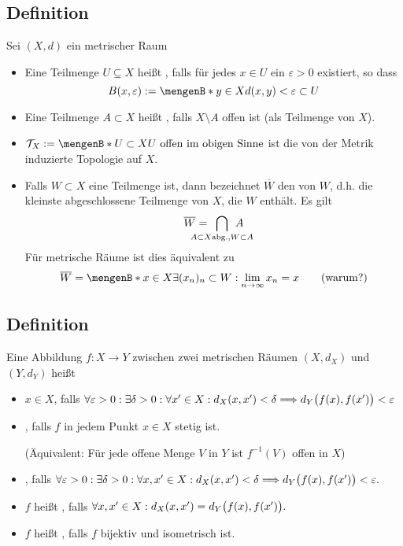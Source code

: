 \subsection[Definition: Offen, abgeschlossen und Abschluss]{Definition} %
\label{sub:12}
Sei $(X,d)$ ein metrischer Raum
\begin{itemize}
	\item Eine Teilmenge $U \subseteq X$ heißt , falls für jedes $x \in U$ ein $\varepsilon > 0$ existiert, so dass 
	\[
		B(x,\varepsilon) := \set[y \in X]{d(x,y) < \varepsilon} \subset U 
	\]
	\item Eine Teilmenge $A \subset X$ heißt , falls $X \setminus A$ offen ist (als Teilmenge von $X$). 
	\item $\mathcal{T}_X := \set[U \subset X]{U \text{ offen im obigen Sinne}} $ ist die von der Metrik induzierte Topologie auf $X$.
	\item Falls $W \subset X$ eine Teilmenge ist, dann bezeichnet $\overline{W}$ den  von $W$, d.h. die kleinste abgeschlossene Teilmenge von $X$, die 
	$W$ enthält. Es gilt
	\[
		\overline{W} = \enspace\bigcap_{\mathclap{A \subset X \text{abg.}, W \subset A}} \enspace A 
	\]
	Für metrische Räume ist dies äquivalent zu
	\[
		\overline{W} = \set[x \in X]{\exists (x_n)_n \subset W : \lim_{n \to \infty} x_n = x} \tag*{(warum?)}
	\]
\end{itemize}

\subsection[Definition: Stetigkeit, gleichmäßige Stetigkeit, Isometrie]{Definition} %
\label{sub:13}
Eine Abbildung $f \colon X \to Y$ zwischen zwei metrischen Räumen $(X,d_X)$ und $(Y,d_Y)$ heißt 
\begin{itemize}
	\item {} $x \in X$, falls
	\(
		\forall \varepsilon >0 : \exists \delta >0 : \forall x' \in X : d_X(x,x') < \delta  \Longrightarrow d_Y \enbrace[\big]{f(x), f(x')} < \varepsilon 
	\)
	\item {}, falls $f$ in jedem Punkt $x \in X$ stetig ist.
	
	(Äquivalent: Für jede offene Menge $V$ in $Y$ ist $f ^{-1}(V)$ offen in $X$) 
	\item {}, falls
	\(
		\forall \varepsilon>0 : \exists \delta >0 : \forall x,x' \in X : d_X(x,x') < \delta \Longrightarrow d_Y \enbrace[\big]{f(x), f(x')} < \varepsilon .
	\) 
	\item $f$ heißt , falls 
	\(
		\forall x,x' \in X : d_X(x,x') = d_Y \enbrace[\big]{f(x), f(x')}.
	\)
	\item $f$ heißt , falls $f$ bijektiv und isometrisch ist. 
\end{itemize}

